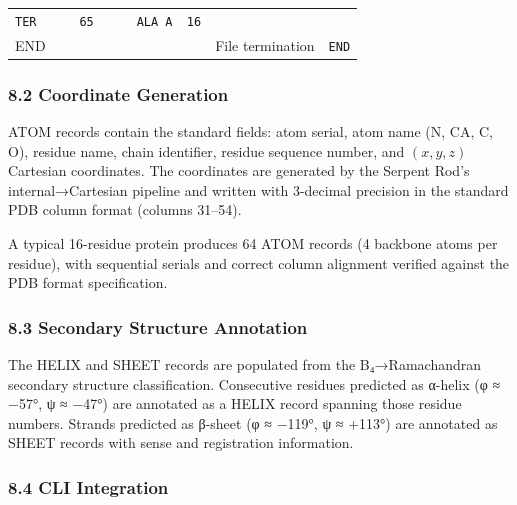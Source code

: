 \begin{longtable}[]{@{}lll@{}}
\begin{minipage}[t]{0.32\columnwidth}
\texttt{TER\ \ \ \ \ \ 65\ \ \ \ \ \ ALA\ A\ \ 16}\strut
\end{minipage}\tabularnewline
\begin{minipage}[t]{0.28\columnwidth}\raggedright
END\strut
\end{minipage} & \begin{minipage}[t]{0.32\columnwidth}\raggedright
File termination\strut
\end{minipage} & \begin{minipage}[t]{0.32\columnwidth}\raggedright
\texttt{END}\strut
\end{minipage}\tabularnewline
\bottomrule
\end{longtable}

\hypertarget{coordinate-generation}{%
\subsubsection{8.2 Coordinate Generation}\label{coordinate-generation}}

ATOM records contain the standard fields: atom serial, atom name (N, CA,
C, O), residue name, chain identifier, residue sequence number, and
\((x, y, z)\) Cartesian coordinates. The coordinates are generated by
the Serpent Rod's internal→Cartesian pipeline and written with 3-decimal
precision in the standard PDB column format (columns 31--54).

A typical 16-residue protein produces 64 ATOM records (4 backbone atoms
per residue), with sequential serials and correct column alignment
verified against the PDB format specification.

\hypertarget{secondary-structure-annotation}{%
\subsubsection{8.3 Secondary Structure
Annotation}\label{secondary-structure-annotation}}

The HELIX and SHEET records are populated from the B₄→Ramachandran
secondary structure classification. Consecutive residues predicted as
α-helix (φ ≈ −57°, ψ ≈ −47°) are annotated as a HELIX record spanning
those residue numbers. Strands predicted as β-sheet (φ ≈ −119°, ψ ≈
+113°) are annotated as SHEET records with sense and registration
information.

\hypertarget{cli-integration}{%
\subsubsection{8.4 CLI Integration}\label{cli-integration}}

